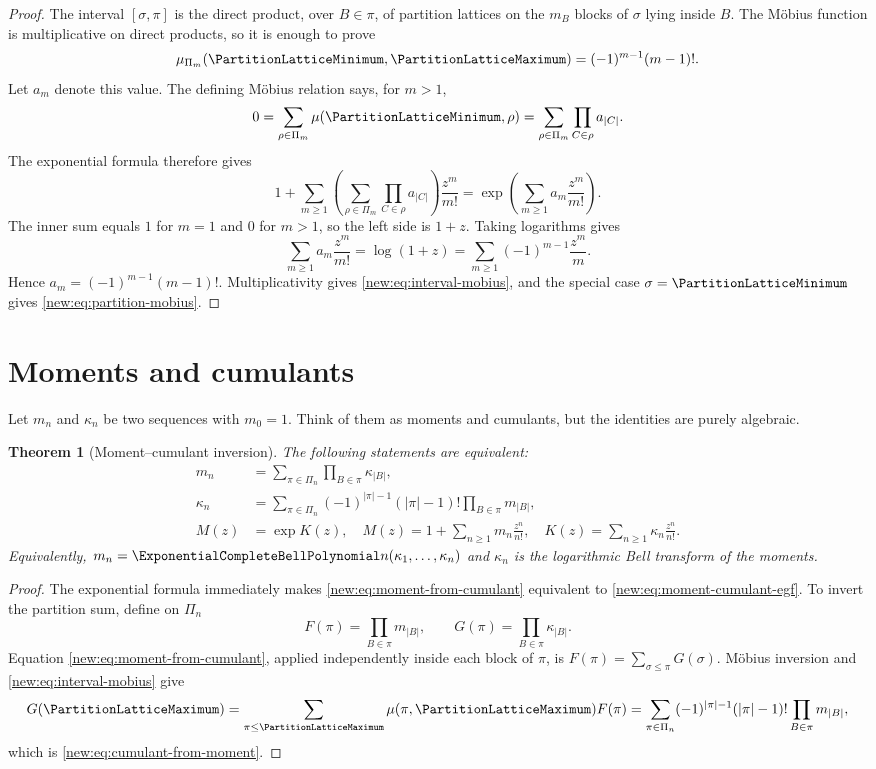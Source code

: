 \documentclass[11pt,a4paper,oneside,openany]{book}
\newtheorem{theorem}{Theorem}[chapter]
\theoremstyle{definition}
\theoremstyle{remark}
\begin{document}
\begin{proof}
The interval $[\sigma,\pi]$ is the direct product, over $B\in\pi$, of partition
lattices on the $m_B$ blocks of $\sigma$ lying inside $B$.  The M\"obius
function is multiplicative on direct products, so it is enough to prove
\[
 \mu_{\Pi_m}(\PartitionLatticeMinimum,\PartitionLatticeMaximum)=(-1)^{m-1}(m-1)!.
\]
Let $a_m$ denote this value.  The defining M\"obius relation says, for $m>1$,
\[
 0=\sum_{\rho\in\Pi_m}\mu(\PartitionLatticeMinimum,\rho)
  =\sum_{\rho\in\Pi_m}\prod_{C\in\rho}a_{|C|}.
\]
The exponential formula therefore gives
\[
 1+\sum_{m\ge1}\left(\sum_{\rho\in\Pi_m}
       \prod_{C\in\rho}a_{|C|}\right)\frac{z^m}{m!}
 =\exp\left(\sum_{m\ge1}a_m\frac{z^m}{m!}\right).
\]
The inner sum equals $1$ for $m=1$ and $0$ for $m>1$, so the left side is
$1+z$.  Taking logarithms gives
\[
 \sum_{m\ge1}a_m\frac{z^m}{m!}=\log(1+z)
 =\sum_{m\ge1}(-1)^{m-1}\frac{z^m}{m}.
\]
Hence $a_m=(-1)^{m-1}(m-1)!$.  Multiplicativity gives
\eqref{new:eq:interval-mobius}, and the special case $\sigma=\PartitionLatticeMinimum$ gives
\eqref{new:eq:partition-mobius}.
\end{proof}

\section{Moments and cumulants}

Let $m_n$ and $\kappa_n$ be two sequences with $m_0=1$.  Think of them as
moments and cumulants, but the identities are purely algebraic.

\begin{theorem}[Moment--cumulant inversion]
The following statements are equivalent:
\begin{align}
 m_n&=\sum_{\pi\in\Pi_n}\prod_{B\in\pi}\kappa_{|B|},
 \label{new:eq:moment-from-cumulant}\\
 \kappa_n&=\sum_{\pi\in\Pi_n}
 (-1)^{|\pi|-1}(|\pi|-1)!
 \prod_{B\in\pi}m_{|B|},
 \label{new:eq:cumulant-from-moment}\\
 M(z)&=\exp K(z),
 \quad
 M(z)=1+\sum_{n\ge1}m_n\frac{z^n}{n!},
 \quad
 K(z)=\sum_{n\ge1}\kappa_n\frac{z^n}{n!}.
 \label{new:eq:moment-cumulant-egf}
\end{align}
Equivalently, $m_n=\ExponentialCompleteBellPolynomial n(\kappa_1,\ldots,\kappa_n)$ and
$\kappa_n$ is the logarithmic Bell transform of the moments.
\end{theorem}

\begin{proof}
The exponential formula immediately makes
\eqref{new:eq:moment-from-cumulant} equivalent to
\eqref{new:eq:moment-cumulant-egf}.  To invert the partition sum, define on
$\Pi_n$
\[
 F(\pi)=\prod_{B\in\pi}m_{|B|},\qquad
 G(\pi)=\prod_{B\in\pi}\kappa_{|B|}.
\]
Equation \eqref{new:eq:moment-from-cumulant}, applied independently inside each
block of $\pi$, is $F(\pi)=\sum_{\sigma\le\pi}G(\sigma)$.  M\"obius inversion
and \eqref{new:eq:interval-mobius} give
\[
 G(\PartitionLatticeMaximum)=\sum_{\pi\le\PartitionLatticeMaximum}\mu(\pi,\PartitionLatticeMaximum)F(\pi)
 =\sum_{\pi\in\Pi_n}(-1)^{|\pi|-1}(|\pi|-1)!
  \prod_{B\in\pi}m_{|B|},
\]
which is \eqref{new:eq:cumulant-from-moment}.
\end{proof}
\end{document}
